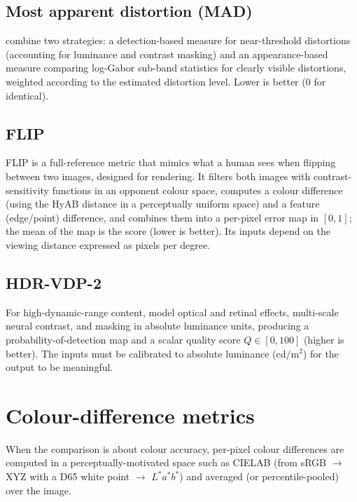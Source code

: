 \subsection{Most apparent distortion (MAD)}
\citet{larson2010mad} combine two strategies: a detection-based measure for near-threshold distortions (accounting for luminance and contrast masking) and an appearance-based measure comparing log-Gabor sub-band statistics for clearly visible distortions, weighted according to the estimated distortion level. Lower is better ($0$ for identical).

\subsection{FLIP}
FLIP \citep{andersson2020flip} is a full-reference metric that mimics what a human sees when flipping between two images, designed for rendering. It filters both images with contrast-sensitivity functions in an opponent colour space, computes a colour difference (using the HyAB distance in a perceptually uniform space) and a feature (edge/point) difference, and combines them into a per-pixel error map in $[0,1]$; the mean of the map is the score (lower is better). Its inputs depend on the viewing distance expressed as pixels per degree.

\subsection{HDR-VDP-2}
For high-dynamic-range content, \citet{mantiuk2011hdrvdp} model optical and retinal effects, multi-scale neural contrast, and masking in absolute luminance units, producing a probability-of-detection map and a scalar quality score $Q\in[0,100]$ (higher is better). The inputs must be calibrated to absolute luminance (cd/m$^2$) for the output to be meaningful.

\section{Colour-difference metrics}

When the comparison is about colour accuracy, per-pixel colour differences are computed in a perceptually-motivated space such as CIELAB (from sRGB $\to$ XYZ with a D65 white point $\to$ $L^*a^*b^*$) and averaged (or percentile-pooled) over the image.

